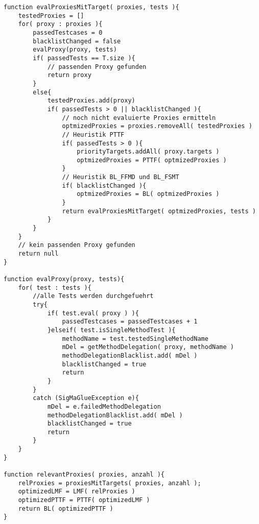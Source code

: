 \begin{lstlisting}[style = pseudo, caption = Kombination aller Heuristiken, captionpos = b, label = lst_heuristikkombination]
function evalProxiesMitTarget( proxies, tests ){
	testedProxies = []
	for( proxy : proxies ){
		passedTestcases = 0
		blacklistChanged = false
		evalProxy(proxy, tests)
		if( passedTests == T.size ){
			// passenden Proxy gefunden
			return proxy
		}
		else{
			testedProxies.add(proxy)
			if( passedTests > 0 || blacklistChanged ){
				// noch nicht evaluierte Proxies ermitteln
				optmizedProxies = proxies.removeAll( testedProxies )
				// Heuristik PTTF
				if( passedTests > 0 ){
					priorityTargets.addAll( proxy.targets )
					optmizedProxies = PTTF( optmizedProxies )	
				}
				// Heuristik BL_FFMD und BL_FSMT
				if( blacklistChanged ){
					optmizedProxies = BL( optmizedProxies )	
				}
				return evalProxiesMitTarget( optmizedProxies, tests )
			}
		}
	}
	// kein passenden Proxy gefunden
	return null
}

function evalProxy(proxy, tests){
	for( test : tests ){
		//alle Tests werden durchgefuehrt	
		try{
			if( test.eval( proxy ) ){
				passedTestcases = passedTestcases + 1
			}elseif( test.isSingleMethodTest ){
				methodName = test.testedSingleMethodName
				mDel = getMethodDelegation( proxy, methodName )
				methodDelegationBlacklist.add( mDel )
				blacklistChanged = true
				return
			}
		}
		catch (SigMaGlueException e){
			mDel = e.failedMethodDelegation
			methodDelegationBlacklist.add( mDel )
			blacklistChanged = true
			return
		} 
	}
}

function relevantProxies( proxies, anzahl ){
	relProxies = proxiesMitTargets( proxies, anzahl );
	optimizedLMF = LMF( relProxies )
	optimizedPTTF = PTTF( optimizedLMF )
	return BL( optimizedPTTF )
} 


\end{lstlisting}

